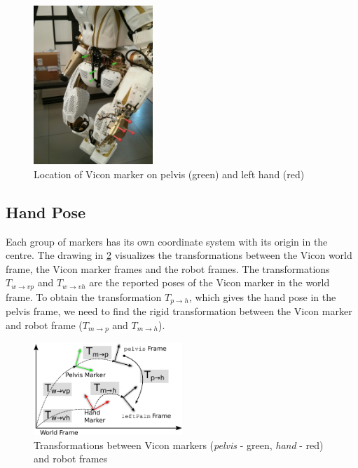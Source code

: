 \begin{figure}
\captionsetup{width=0.4\textwidth}
\centering
\includegraphics[width=0.4\textwidth]{images/vicon_pose/vicon_marker_col.jpg}
\caption[Location of Vicon marker]{Location of Vicon marker on pelvis (green) and left hand (red)}
\label{fig:vicon_marker}
\end{figure}


\subsection{Hand Pose}

Each group of markers has its own coordinate system with its origin in the centre.
The drawing in \cref{fig:transform_vicon_robot} visualizes the transformations between the Vicon world frame, the Vicon marker frames and the robot frames.
The transformations $T_{w \rightarrow vp}$ and $T_{w \rightarrow vh}$ are the reported poses of the Vicon marker in the world frame.
To obtain the transformation $T_{p \rightarrow h}$, which gives the hand pose in the pelvis frame, we need to find the rigid transformation between the Vicon marker and robot frame ($T_{m \rightarrow p}$ and $T_{m \rightarrow h}$).

\begin{figure}
\captionsetup{width=0.52\textwidth}
\centering
\includegraphics[width=0.5\textwidth]{images/vicon_pose/vicon_transforms.pdf}
\caption[Transformations of Vicon markers]{Transformations between Vicon markers (\textit{pelvis} - green, \textit{hand} - red) and robot frames}
\label{fig:transform_vicon_robot}
\end{figure}

